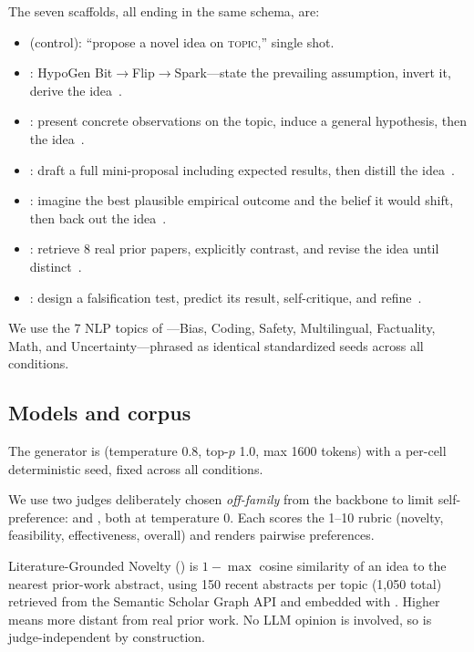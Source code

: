  The seven scaffolds, all ending in the same schema, are:
\begin{itemize}[leftmargin=*,itemsep=1pt,topsep=2pt]
    \item \unguided (control): ``propose a novel idea on \textsc{topic},'' single shot.
    \item \deduction: HypoGen Bit$\rightarrow$Flip$\rightarrow$Spark---state the prevailing assumption, invert it, derive the idea~\citep{hypogen2025}.
    \item \induction: present concrete observations on the topic, induce a general hypothesis, then the idea~\citep{yang2023moose}.
    \item \proposal: draft a full mini-proposal including expected results, then distill the idea~\citep{si2024can}.
    \item \outcome: imagine the best plausible empirical outcome and the belief it would shift, then back out the idea~\citep{autodiscovery2025}.
    \item \litcomp: retrieve 8 real prior papers, explicitly contrast, and revise the idea until distinct~\citep{wang2023scimon}.
    \item \smallexp: design a falsification test, predict its result, self-critique, and refine~\citep{deepideation2025}.
\end{itemize}

 We use the 7 NLP topics of \citet{si2024can}---Bias, Coding, Safety, Multilingual, Factuality, Math, and Uncertainty---phrased as identical standardized seeds across all conditions.

\subsection{Models and corpus}

 The generator is \gptfourone (temperature 0.8, top-$p$ 1.0, max 1600 tokens) with a per-cell deterministic seed, fixed across all conditions.

 We use two judges deliberately chosen \emph{off-family} from the backbone to limit self-preference: \claudesonnet and \geminiflash, both at temperature 0. Each scores the \citet{si2024can} 1--10 rubric (novelty, feasibility, effectiveness, overall) and renders pairwise preferences.

 Literature-Grounded Novelty (\lgn) is $1 - \max$ cosine similarity of an idea to the nearest prior-work abstract, using 150 recent abstracts per topic (1{,}050 total) retrieved from the Semantic Scholar Graph API and embedded with \mpnet. Higher \lgn means more distant from real prior work. No LLM opinion is involved, so \lgn is judge-independent by construction.

